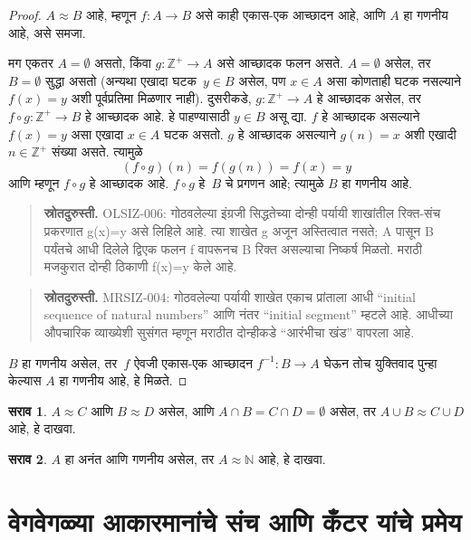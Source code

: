 \documentclass[11pt,a4paper,openany]{book}
\theoremstyle{definition}
\newtheorem{prob}{सराव}[chapter]
\newcommand{\Nat}{\mathbb{N}}
\newcommand{\PosInt}{\mathbb{Z}^{+}}
\newcommand{\comp}[2]{#2\circ #1}
\newcommand{\cardeq}[2]{#1 \approx #2}
\begin{document}
\begin{proof}
$\cardeq{A}{B}$ आहे, म्हणून $f \colon A
\to B$ असे काही एकास-एक आच्छादन आहे, आणि $A$ हा गणनीय आहे,
असे समजा.

  मग एकतर $A = \emptyset$ असतो, किंवा $g\colon \PosInt \to A$ असे
  आच्छादक फलन असते. $A = \emptyset$ असेल, तर $B = \emptyset$
  सुद्धा असतो (अन्यथा एखादा घटक~$y \in B$ असेल,
  पण $x \in A$ असा कोणताही घटक नसल्याने $f(x) = y$ अशी पूर्वप्रतिमा
  मिळणार नाही). दुसरीकडे, $g\colon \PosInt \to A$ हे आच्छादक
  असेल, तर $\comp{g}{f} \colon \PosInt \to B$ हे आच्छादक आहे.
  हे पाहण्यासाठी $y \in B$ असू द्या. $f$ हे आच्छादक असल्याने
  $f(x) = y$ असा एखादा $x \in A$ घटक असतो. $g$ हे आच्छादक
  असल्याने $g(n) =
  x$ अशी एखादी $n \in \PosInt$ संख्या असते. त्यामुळे
\[
(\comp{g}{f})(n) = f(g(n)) = f(x) = y
\]
  आणि म्हणून $\comp{g}{f}$ हे आच्छादक आहे. $\comp{g}{f}$ हे~$B$
  चे प्रगणन आहे; त्यामुळे $B$ हा गणनीय आहे.
\begin{quote}\small\textbf{स्रोतदुरुस्ती.} OLSIZ-006: गोठवलेल्या इंग्रजी सिद्धतेच्या दोन्ही पर्यायी शाखांतील रिक्त-संच प्रकरणात g(x)=y असे लिहिले आहे. त्या शाखेत g अजून अस्तित्वात नसते; A पासून B पर्यंतचे आधी दिलेले द्विएक फलन f वापरूनच B रिक्त असल्याचा निष्कर्ष मिळतो. मराठी मजकुरात दोन्ही ठिकाणी f(x)=y केले आहे.\end{quote}
\begin{quote}\small\textbf{स्रोतदुरुस्ती.} MRSIZ-004: गोठवलेल्या पर्यायी शाखेत एकाच प्रांताला आधी “initial sequence of natural numbers” आणि नंतर “initial segment” म्हटले आहे. आधीच्या औपचारिक व्याख्येशी सुसंगत म्हणून मराठीत दोन्हीकडे “आरंभीचा खंड” वापरला आहे.\end{quote}

$B$ हा गणनीय असेल, तर~$f$ ऐवजी
एकास-एक आच्छादन $f^{-1}\colon B \to A$ घेऊन तोच युक्तिवाद पुन्हा केल्यास
$A$ हा गणनीय आहे, हे मिळते.
\end{proof}

\begin{prob}
$\cardeq{A}{C}$ आणि $\cardeq{B}{D}$ असेल, आणि $A \cap B =
C \cap D = \emptyset$ असेल, तर $\cardeq{A \cup B}{C \cup D}$ आहे,
हे दाखवा.
\end{prob}

\begin{prob}
$A$ हा अनंत आणि गणनीय असेल, तर $\cardeq{A}{\Nat}$ आहे, हे
दाखवा.
\end{prob}









\section{वेगवेगळ्या आकारमानांचे संच आणि कँटर यांचे प्रमेय}\label{sfr:siz:car:sec}
\end{document}
